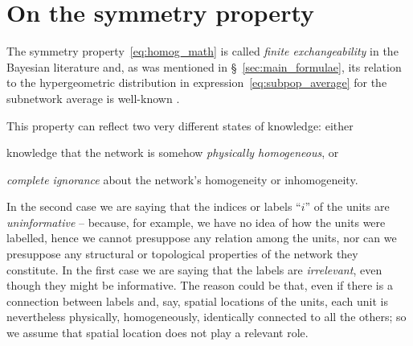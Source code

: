 \documentclass{article}
\newcommand*{\citep}{\parencites}
\theoremstyle{innote}
\renewcommand*{\|}{\cond}
\newcommand*{\+}{\lor}
\newcommand*{\sect}{\S}%
\begin{document}
\bigskip

\section{On the  symmetry property}
\label{sec:stoch_symm}

The symmetry property~\eqref{eq:homog_math} is called \emph{finite
  exchangeability} in the Bayesian literature and, as was mentioned in
\sect~\ref{sec:main_formulae}, its relation to the hypergeometric
distribution in expression~\eqref{eq:subpop_average} for the subnetwork
average is
well-known
\citep{kendall1967,definetti1969b,heathetal1976,diaconis1977,diaconisetal1980,jaynes1986c}.


This property can reflect two very different states of knowledge:
either \begin{inparaenum}[(a)]\item knowledge that the network is somehow
  \emph{physically homogeneous}, or
\item \emph{complete ignorance} about the network's homogeneity or inhomogeneity.
\end{inparaenum}
In the second case we are saying that the indices or labels \enquote{$i$}
of the units are \emph{uninformative} -- because, for example, we have no
idea of how the units were labelled, hence we cannot presuppose any
relation among the units, nor can we presuppose any structural or
topological properties of the network they constitute. In the first case we
are saying that the labels are \emph{irrelevant}, even though they might be
informative. The reason could be that, even if there is a connection
between labels and, say, spatial locations of the units, each unit is
nevertheless physically, homogeneously, identically connected to all the
others; so we assume that spatial location does not play a relevant role.
\end{document}

